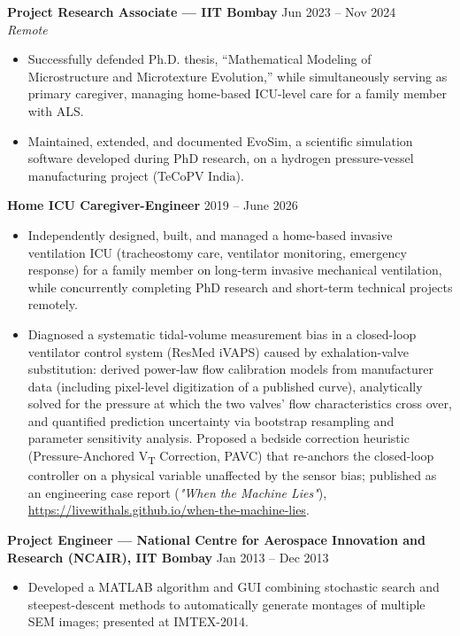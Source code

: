 \documentclass[10.5pt,a4paper]{article}
\newenvironment{tightitemize}
  {\begin{itemize}[leftmargin=1.2em,itemsep=1pt,topsep=2pt,parsep=0pt]}
  {\end{itemize}}
\newcommand{\entry}[3]{%
  \par\noindent\textbf{#1} \hfill #2\\
  {\itshape\small #3}\par\smallskip
}
\begin{document}
\entry{Project Research Associate --- IIT Bombay}{Jun 2023 -- Nov 2024}{Remote}
\begin{tightitemize}
\item Successfully defended Ph.D. thesis, ``Mathematical Modeling of Microstructure and Microtexture Evolution,'' while simultaneously serving as primary caregiver, managing home-based ICU-level care for a family member with ALS.
\item Maintained, extended, and documented EvoSim, a scientific simulation software developed during PhD research, on a hydrogen pressure-vessel manufacturing project (TeCoPV India).
\end{tightitemize}

\entry{Home ICU Caregiver-Engineer}{2019 -- June 2026}{}
\begin{tightitemize}
\item Independently designed, built, and managed a home-based invasive ventilation ICU (tracheostomy care, ventilator monitoring, emergency response) for a family member on long-term invasive mechanical ventilation, while concurrently completing PhD research and short-term technical projects remotely.
\item Diagnosed a systematic tidal-volume measurement bias in a closed-loop ventilator control system (ResMed iVAPS) caused by exhalation-valve substitution: derived power-law flow calibration models from manufacturer data (including pixel-level digitization of a published curve), analytically solved for the pressure at which the two valves' flow characteristics cross over, and quantified prediction uncertainty via bootstrap resampling and parameter sensitivity analysis. Proposed a bedside correction heuristic (Pressure-Anchored V\textsubscript{T} Correction, PAVC) that re-anchors the closed-loop controller on a physical variable unaffected by the sensor bias; published as an engineering case report (\textit{"When the Machine Lies"}), \url{https://livewithals.github.io/when-the-machine-lies}.

\end{tightitemize}

\entry{Project Engineer --- National Centre for Aerospace Innovation and Research (NCAIR), IIT Bombay}{Jan 2013 -- Dec 2013}{}
\begin{tightitemize}
\item Developed a MATLAB algorithm and GUI combining stochastic search and steepest-descent methods to automatically generate montages of multiple SEM images; presented at IMTEX-2014.
\end{tightitemize}
\end{document}
